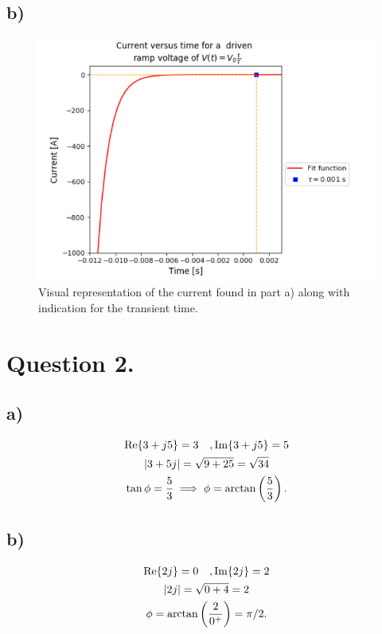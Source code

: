 \documentclass[
	12pt,
	]{article}
\theoremstyle{definition}
\theoremstyle{definition}
\theoremstyle{definition}
\theoremstyle{definition}
\theoremstyle{definition}
\theoremstyle{example}
\theoremstyle{note}
\theoremstyle{remark}
\theoremstyle{example}
\begin{document}
			\subsection*{b) }
			\begin{figure}[h!]
				\centering
				\includegraphics[width=\linewidth]{plot_phys241_ass3_1.png}
				\caption{Visual representation of the current found in part a) along with indication for the transient time.}
			\end{figure}
		\section*{Question 2.}
			\subsection*{a) }
				\begin{gather*}
					\Re{3 + j5} = 3\quad, \Im{3 + j5} = 5\\
					\abs{3+5j} = \sqrt{9+ 25} = \sqrt{34}\\
					\tan \phi = \frac{5}{3} \implies \phi = \arctan\left(\frac53\right).
				\end{gather*}
			\subsection*{b) }
				\begin{gather*}
					\Re{2j} = 0 \quad, \Im{2j} = 2\\
					\abs{2j} = \sqrt{0+4} = 2\\
					\phi = \arctan \left(\frac{2}{0^{+}}\right) = \pi/2 .
				\end{gather*}
\end{document}
